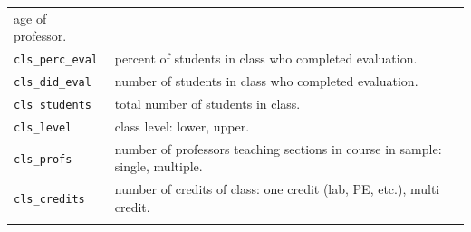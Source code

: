 \documentclass[]{article}
\begin{document}
\begin{longtable}[]{@{}ll@{}}
\begin{minipage}[t]{0.16\columnwidth}
age of professor.\strut
\end{minipage}\tabularnewline
\begin{minipage}[t]{0.22\columnwidth}\raggedright\strut
\texttt{cls\_perc\_eval}\strut
\end{minipage} & \begin{minipage}[t]{0.16\columnwidth}\raggedright\strut
percent of students in class who completed evaluation.\strut
\end{minipage}\tabularnewline
\begin{minipage}[t]{0.22\columnwidth}\raggedright\strut
\texttt{cls\_did\_eval}\strut
\end{minipage} & \begin{minipage}[t]{0.16\columnwidth}\raggedright\strut
number of students in class who completed evaluation.\strut
\end{minipage}\tabularnewline
\begin{minipage}[t]{0.22\columnwidth}\raggedright\strut
\texttt{cls\_students}\strut
\end{minipage} & \begin{minipage}[t]{0.16\columnwidth}\raggedright\strut
total number of students in class.\strut
\end{minipage}\tabularnewline
\begin{minipage}[t]{0.22\columnwidth}\raggedright\strut
\texttt{cls\_level}\strut
\end{minipage} & \begin{minipage}[t]{0.16\columnwidth}\raggedright\strut
class level: lower, upper.\strut
\end{minipage}\tabularnewline
\begin{minipage}[t]{0.22\columnwidth}\raggedright\strut
\texttt{cls\_profs}\strut
\end{minipage} & \begin{minipage}[t]{0.16\columnwidth}\raggedright\strut
number of professors teaching sections in course in sample: single,
multiple.\strut
\end{minipage}\tabularnewline
\begin{minipage}[t]{0.22\columnwidth}\raggedright\strut
\texttt{cls\_credits}\strut
\end{minipage} & \begin{minipage}[t]{0.16\columnwidth}\raggedright\strut
number of credits of class: one credit (lab, PE, etc.), multi
credit.\strut
\end{minipage}\tabularnewline
\begin{minipage}[t]{0.22\columnwidth}\raggedright\strut

\end{minipage}
\end{longtable}
\end{document}
